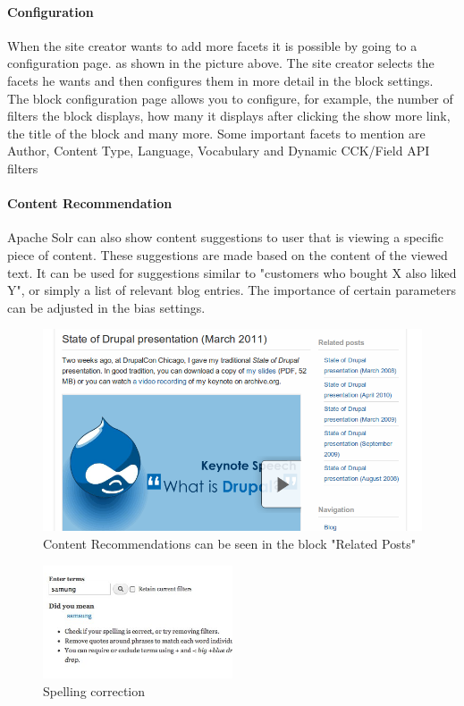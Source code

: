 \paragraph{Configuration} When the site creator wants to add more facets it is possible by going to a configuration page. as shown in the picture above. The site creator selects the facets he wants and then configures them in more detail in the block settings. The block configuration page allows you to configure, for example, the number of filters the block displays, how many it displays after clicking the show more link, the title of the block and many more. Some important facets to mention are Author, Content Type, Language, Vocabulary and Dynamic CCK/Field API filters

\paragraph{Content Recommendation}
Apache Solr can also show content suggestions to user that is viewing a specific piece of content. These suggestions are made based on the content of the viewed text. It can be used for suggestions similar to "customers who bought X also liked Y", or simply a list of relevant blog entries. The importance of certain parameters can be adjusted in the bias settings.
\begin{figure}[H]
     \includegraphics[width=\textwidth]{images/more_like_this.png}
     \caption{Content Recommendations can be seen in the block "Related Posts"}
\end{figure}

\begin{figure}
\begin{center}
     \includegraphics[width=0.5\textwidth]{images/spellchecker.jpg}
     \caption{Spelling correction}
\end{center}
\end{figure}
